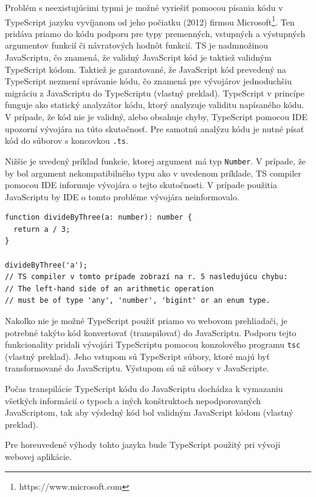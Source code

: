 Problém s neexistujúcimi typmi je možné vyriešiť pomocou písania kódu v TypeScript jazyku vyvíjanom od jeho počiatku (2012) firmou Microsoft\footnote{https://www.microsoft.com}. Ten pridáva priamo do kódu podporu pre typy premenných, vstupných a výstupných argumentov funkcií či návratových hodnôt funkcií. TS je nadmnožinou JavaScriptu, čo znamená, že validný JavaScript kód je taktiež validným TypeScript kódom. Taktiež je garantované, že JavaScript kód prevedený na TypeScript nezmení správanie kódu, čo znamená pre vývojárov jednoduchšiu migráciu z JavaScriptu do TypeScriptu \cite{about_typescript} (vlastný preklad). TypeScript v princípe funguje ako statický analyzátor kódu, ktorý analyzuje validitu napísaného kódu. V prípade, že kód nie je validný, alebo obsahuje chyby, TypeScript pomocou IDE upozorní vývojára na túto skutočnosť. Pre samotnú analýzu kódu je nutné písať kód do súborov s koncovkou \texttt{.ts}.

Nižšie je uvedený príklad funkcie, ktorej argument má typ \texttt{Number}. V prípade, že by bol argument nekompatibilného typu ako v uvedenom príklade, TS compiler pomocou IDE informuje vývojára o tejto skutočnosti. V prípade použitia JavaScriptu by IDE o tomto probléme vývojára neinformovalo. 
\begin{verbatim}
function divideByThree(a: number): number {
  return a / 3;
}

divideByThree('a');
// TS compiler v tomto prípade zobrazí na r. 5 nasledujúcu chybu:
// The left-hand side of an arithmetic operation
// must be of type 'any', 'number', 'bigint' or an enum type.
\end{verbatim}

Nakoľko nie je možné TypeScript použiť priamo vo webovom prehliadači, je potrebné takýto kód konvertovať (transpilovať) do JavaScriptu. Podporu tejto funkcionality pridali vývojári TypeScriptu pomocou konzolového programu \texttt{tsc} \cite{about_typescript} (vlastný preklad). Jeho vstupom sú TypeScript súbory, ktoré majú byť transformované do JavaScriptu. Výstupom sú už súbory v JavaScripte.

Počas transpilácie TypeScript kódu do JavaScriptu dochádza k vymazaniu všetkých informácií o typoch a iných konštruktoch nepodporovaných JavaScriptom, tak aby výsledný kód bol validným JavaScript kódom \cite{about_typescript} (vlastný preklad).

Pre horeuvedené výhody tohto jazyka bude TypeScript použitý pri vývoji webovej aplikácie.

